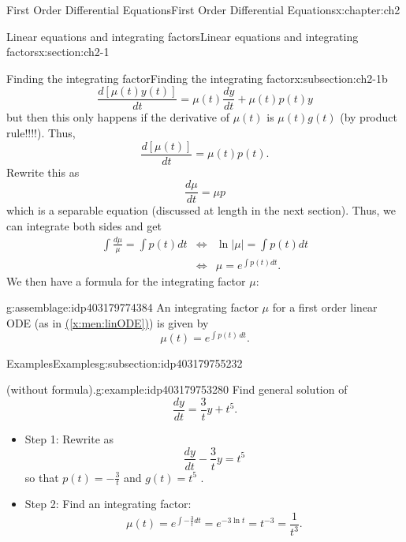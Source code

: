 \documentclass[oneside,10pt,]{book}
\newcommand{\xreffont}{\relax}
\numberwithin{equation}{section}
\numberwithin{equation}{section}
\newcommand{\amp}{&}
\begin{document}
\begin{chapterptx}{First Order Differential Equations}{}{First Order Differential Equations}{}{}{x:chapter:ch2}
\begin{sectionptx}{Linear equations and integrating factors}{}{Linear equations and integrating factors}{}{}{x:section:ch2-1}
\begin{subsectionptx}{Finding the integrating factor}{}{Finding the integrating factor}{}{}{x:subsection:ch2-1b}
\begin{equation*}
\frac{d\left[\mu(t)y(t)\right]}{dt}=\mu(t)\frac{dy}{dt}+\mu(t)p(t)y
\end{equation*}
but then this only happens if the derivative of \(\mu(t)\) is \(\mu(t)g(t)\) (by product rule!!!!). Thus,%
\begin{equation*}
\frac{d\left[\mu(t)\right]}{dt}=\mu(t)p(t).
\end{equation*}
Rewrite this as%
\begin{equation*}
\frac{d\mu}{dt}=\mu p
\end{equation*}
which is a separable equation (discussed at length in the next section). Thus, we can integrate both sides and get%
\begin{align*}
\int\frac{d\mu}{\mu}=\int p(t)dt \amp \iff \amp \ln\left|\mu\right|=\int p(t)dt\\
\amp \iff \amp \mu=e^{\int p(t)dt}.
\end{align*}
We then have a formula for the integrating factor \(\mu\):%
\begin{assemblage}{}{g:assemblage:idp403179774384}%
An integrating factor \(\mu\) for a first order linear ODE (as in \hyperref[x:men:linODE]{({\xreffont\ref{x:men:linODE}})}) is given by%
\begin{equation*}
\mu(t)=e^{\int p(t)\,dt}.
\end{equation*}
%
\end{assemblage}
\end{subsectionptx}
%
%
\typeout{************************************************}
\typeout{************************************************}
%
\begin{subsectionptx}{Examples}{}{Examples}{}{}{g:subsection:idp403179755232}
\begin{example}{(without formula).}{g:example:idp403179753280}%
Find general solution of%
\begin{equation*}
\frac{dy}{dt}=\frac{3}{t}y+t^{5}.
\end{equation*}
%
%
\begin{itemize}[label=\textbullet]
\item{}Step 1: Rewrite as%
\begin{equation*}
\frac{dy}{dt}-\frac{3}{t}y=t^{5}
\end{equation*}
so that \(p(t)=-\frac{3}{t}\) and \(g(t)=t^{5}\)%
. \item{}Step 2: Find an integrating factor:%
\begin{equation*}
\mu(t)=e^{\int-\frac{3}{t}dt}=e^{-3\ln t}=t^{-3}=\frac{1}{t^{3}}.
\end{equation*}

\end{itemize}
\end{example}
\end{subsectionptx}
\end{sectionptx}
\end{chapterptx}
\end{document}
